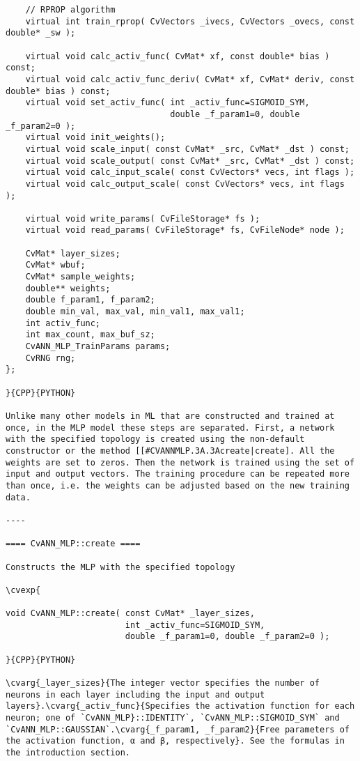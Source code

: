 \begin{verbatim}
    // RPROP algorithm
    virtual int train_rprop( CvVectors _ivecs, CvVectors _ovecs, const double* _sw );

    virtual void calc_activ_func( CvMat* xf, const double* bias ) const;
    virtual void calc_activ_func_deriv( CvMat* xf, CvMat* deriv, const double* bias ) const;
    virtual void set_activ_func( int _activ_func=SIGMOID_SYM,
                                 double _f_param1=0, double _f_param2=0 );
    virtual void init_weights();
    virtual void scale_input( const CvMat* _src, CvMat* _dst ) const;
    virtual void scale_output( const CvMat* _src, CvMat* _dst ) const;
    virtual void calc_input_scale( const CvVectors* vecs, int flags );
    virtual void calc_output_scale( const CvVectors* vecs, int flags );

    virtual void write_params( CvFileStorage* fs );
    virtual void read_params( CvFileStorage* fs, CvFileNode* node );

    CvMat* layer_sizes;
    CvMat* wbuf;
    CvMat* sample_weights;
    double** weights;
    double f_param1, f_param2;
    double min_val, max_val, min_val1, max_val1;
    int activ_func;
    int max_count, max_buf_sz;
    CvANN_MLP_TrainParams params;
    CvRNG rng;
};

}{CPP}{PYTHON}

Unlike many other models in ML that are constructed and trained at once, in the MLP model these steps are separated. First, a network with the specified topology is created using the non-default constructor or the method [[#CVANNMLP.3A.3Acreate|create]. All the weights are set to zeros. Then the network is trained using the set of input and output vectors. The training procedure can be repeated more than once, i.e. the weights can be adjusted based on the new training data.

----

==== CvANN_MLP::create ====

Constructs the MLP with the specified topology

\cvexp{

void CvANN_MLP::create( const CvMat* _layer_sizes,
                        int _activ_func=SIGMOID_SYM,
                        double _f_param1=0, double _f_param2=0 );

}{CPP}{PYTHON}

\cvarg{_layer_sizes}{The integer vector specifies the number of neurons in each layer including the input and output layers}.\cvarg{_activ_func}{Specifies the activation function for each neuron; one of `CvANN_MLP}::IDENTITY`, `CvANN_MLP::SIGMOID_SYM` and `CvANN_MLP::GAUSSIAN`.\cvarg{_f_param1, _f_param2}{Free parameters of the activation function, α and β, respectively}. See the formulas in the introduction section.


\end{verbatim}
